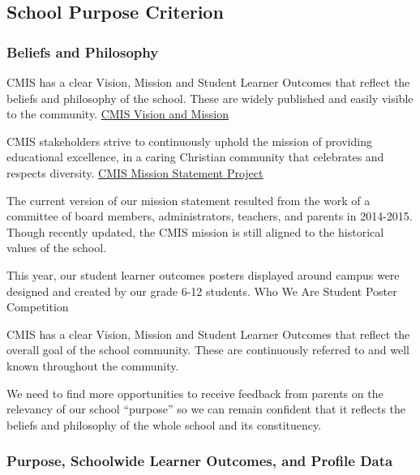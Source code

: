 \subsection{School Purpose Criterion}
\subsubsection{Beliefs and Philosophy}



\begin{findings}
CMIS has a clear Vision, Mission and Student Learner Outcomes that reflect the beliefs and philosophy of the school. These are widely published and easily visible to the community. \href{http://cmis.ac.th/about/vision}{CMIS Vision and Mission} 

CMIS stakeholders strive to continuously uphold the mission of providing educational excellence, in a caring Christian community that celebrates and respects diversity. \href{https://docs.google.com/a/cmis.ac.th/presentation/d/1EJ3zT-xwUj2W--v5mTN6xWOqewtvhXrhTxXuoR1HyAg/edit?usp=sharing}{CMIS Mission Statement Project} 

The current version of our mission statement resulted from the work of a committee of board members, administrators, teachers, and parents in 2014-2015. Though recently updated, the CMIS mission is still aligned to the historical values of the school.

This year, our student learner outcomes posters displayed around campus were designed and created by our grade 6-12 students. Who We Are Student Poster Competition 


CMIS has a clear Vision, Mission and Student Learner Outcomes that reflect the overall goal of the school community. These are continuously referred to and well known throughout the community. 

We need to find more opportunities to receive feedback from parents on the relevancy of our school “purpose” so we can remain confident that it reflects the beliefs and philosophy of the whole school and its constituency.
\end{findings}

\subsubsection{Purpose, Schoolwide Learner Outcomes, and Profile Data}

